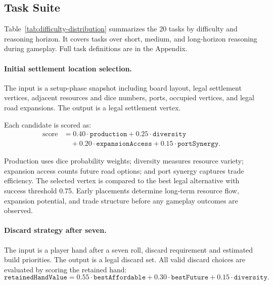 \documentclass{article}
\begin{document}
\subsection{Task Suite}
\label{sec:task-suite}

Table~\ref{tab:difficulty-distribution} summarizes the 20 tasks by difficulty and reasoning horizon. It covers tasks over short, medium, and long-horizon reasoning during gameplay. Full task definitions are in the Appendix.

\paragraph{Initial settlement location selection.}
The input is a setup-phase snapshot including board layout, legal settlement vertices, adjacent resources and dice numbers, ports, occupied vertices, and legal road expansions. The output is a legal settlement vertex.

Each candidate is scored as:
\begin{equation}
\begin{aligned}
\text{score}
&= 0.40 \cdot \texttt{production}
+ 0.25 \cdot \texttt{diversity} \\
&\quad + 0.20 \cdot \texttt{expansionAccess}
+ 0.15 \cdot \texttt{portSynergy}.
\end{aligned}
\end{equation}

Production uses dice probability weights; diversity measures resource variety; expansion access counts future road options; and port synergy captures trade efficiency. The selected vertex is compared to the best legal alternative with success threshold 0.75. Early placements determine long-term resource flow, expansion potential, and trade structure before any gameplay outcomes are observed.

\paragraph{Discard strategy after seven.}
The input is a player hand after a seven roll, discard requirement and estimated build priorities. The output is a legal discard set. All valid discard choices are evaluated by scoring the retained hand:
\begin{equation}
\texttt{retainedHandValue} =
0.55 \cdot \texttt{bestAffordable}
+ 0.30 \cdot \texttt{bestFuture}
+ 0.15 \cdot \texttt{diversity}.
\end{equation}
\end{document}
